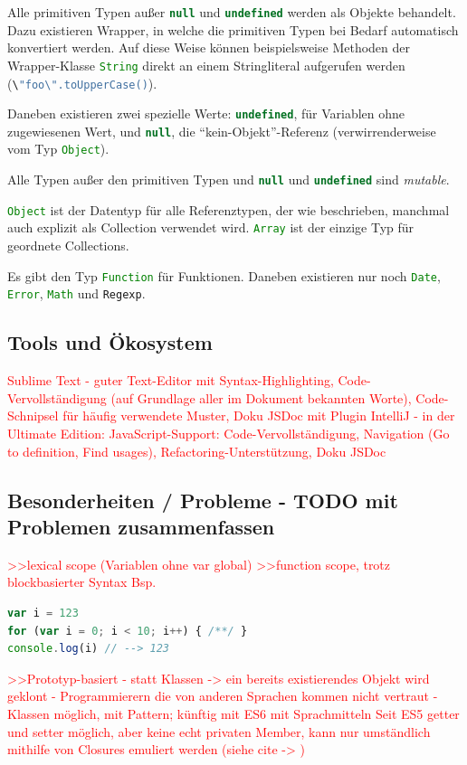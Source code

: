 \documentclass[a4paper, 12pt, hidelinks, listof=totoc, listoftables=totoc, bibliography=totoc]{scrreprt}
\newcommand{\js}[1]{\lstinline[language=JavaScript, style=inline]|#1|}
\newcommand{\TODO}[1]{\textcolor{red}{#1}\newline}
\begin{document}
Alle primitiven Typen außer \js{null} und \js{undefined} werden als Objekte behandelt. Dazu existieren Wrapper, in welche die primitiven Typen bei Bedarf automatisch konvertiert werden. Auf diese Weise können beispielsweise Methoden der Wrapper-Klasse \js{String} direkt an einem Stringliteral aufgerufen werden (\js{\"foo\".toUpperCase()}).

Daneben existieren zwei spezielle Werte: \js{undefined}, für Variablen ohne zugewiesenen Wert, und \js{null}, die "`kein-Objekt"'-Referenz (verwirrenderweise vom Typ \js{Object}).

Alle Typen außer den primitiven Typen und \js{null} und \js{undefined} sind \textit{mutable}.

\js{Object} ist der Datentyp für alle Referenztypen, der wie beschrieben, manchmal auch explizit als Collection verwendet wird. \js{Array} ist der einzige Typ für geordnete Collections.

Es gibt den Typ \js{Function} für Funktionen. Daneben existieren nur noch \js{Date}, \js{Error}, \js{Math} und \js{Regexp}.
\cite[S. 29 ff.]{flanagan2011.JDG}

\subsection{Tools und Ökosystem}

\TODO{Sublime Text - guter Text-Editor mit Syntax-Highlighting, Code-Vervollständigung (auf Grundlage aller im Dokument bekannten Worte), Code-Schnipsel für häufig verwendete Muster, Doku JSDoc mit Plugin}
\TODO{IntelliJ - in der Ultimate Edition: JavaScript-Support: Code-Vervollständigung, Navigation (Go to definition, Find usages), Refactoring-Unterstützung, Doku JSDoc}


\subsection{Besonderheiten / Probleme - TODO mit Problemen zusammenfassen}

\TODO{>>lexical scope (Variablen ohne var global)}
\TODO{>>function scope, trotz blockbasierter Syntax}
\TODO{Bsp.}
\begin{lstlisting}[language=JavaScript, style=snippet]
var i = 123
for (var i = 0; i < 10; i++) { /**/ }
console.log(i) // --> 123
\end{lstlisting}


\TODO{>>Prototyp-basiert}
\TODO{- statt Klassen}
\TODO{-> ein bereits existierendes Objekt wird geklont}
\TODO{- Programmierern die von anderen Sprachen kommen nicht vertraut}
\TODO{- Klassen möglich, mit Pattern; künftig mit ES6 mit Sprachmitteln}
\TODO{Seit ES5 getter und setter möglich, aber keine echt privaten Member, kann nur umständlich mithilfe von Closures emuliert werden}
\TODO{(siehe cite -> %
)}
\end{document}
